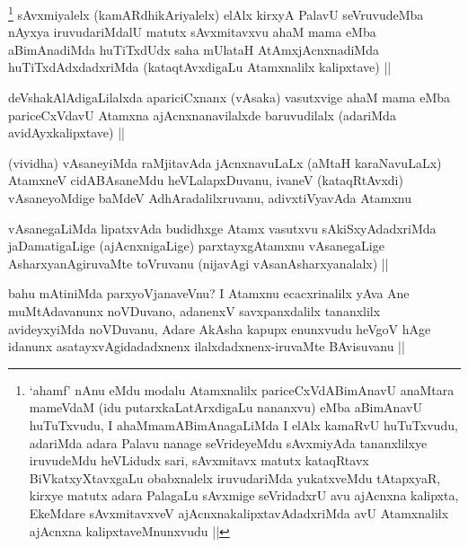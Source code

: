 
\begin{artha}
\footnote{`ahamf' nAnu eMdu modalu Atamxnalilx pariceCxVdABimAnavU anaMtara mameVdaM (idu putarxkaLatArxdigaLu nananxvu) eMba aBimAnavU huTuTxvudu, I ahaMmamABimAnagaLiMda I elAlx kamaRvU huTuTxvudu, adariMda adara Palavu nanage seVrideyeMdu sAvxmiyAda tananxlilxye iruvudeMdu heVLidudx sari, sAvxmitavx matutx kataqRtavx BiVkatxyXtavxgaLu obabxnalelx iruvudariMda yukatxveMdu tAtapxyaR, kirxye matutx adara PalagaLu sAvxmige seVridadxrU avu ajAcnxna kalipxta, EkeMdare sAvxmitavxveV ajAcnxnakalipxtavAdadxriMda avU Atamxnalilx ajAcnxna kalipxtaveMnunxvudu ||}
sAvxmiyalelx (kamARdhikAriyalelx) elAlx kirxyA PalavU seVruvudeMba nAyxya iruvudariMdalU matutx sAvxmitavxvu ahaM mama eMba aBimAnadiMda huTiTxdUdx saha mUlataH AtAmxjAcnxnadiMda huTiTxdAdxdadxriMda (kataqtAvxdigaLu Atamxnalilx kalipxtave) ||
\end{artha}


\begin{artha}
deVshakAlAdigaLilalxda apariciCxnanx (vAsaka) vasutxvige ahaM mama eMba pariceCxVdavU Atamxna ajAcnxnanavilalxde baruvudilalx (adariMda avidAyxkalipxtave) ||
\end{artha}

\begin{artha}
(vividha) vAsaneyiMda raMjitavAda jAcnxnavuLaLx (aMtaH karaNavuLaLx) AtamxneV cidABAsaneMdu heVLalapxDuvanu, ivaneV (kataqRtAvxdi) vAsaneyoMdige baMdeV AdhAradalilxruvanu, adivxtiVyavAda Atamxnu
\end{artha}


\begin{artha}
vAsanegaLiMda lipatxvAda budidhxge Atamx vasutxvu sAkiSxyAdadxriMda jaDamatigaLige (ajAcnxnigaLige) parxtayxgAtamxnu vAsanegaLige AsharxyanAgiruvaMte toVruvanu (nijavAgi vAsanAsharxyanalalx) ||
\end{artha}


\begin{artha}
bahu mAtiniMda parxyoVjanaveVnu? I Atamxnu ecacxrinalilx yAva Ane muMtAdavanunx noVDuvano, adanenxV savxpanxdalilx tananxlilx avideyxyiMda noVDuvanu, Adare AkAsha kapupx enunxvudu heVgoV hAge idanunx asatayxvAgidadadxnenx ilalxdadxnenx-iruvaMte BAvisuvanu ||
\end{artha}

